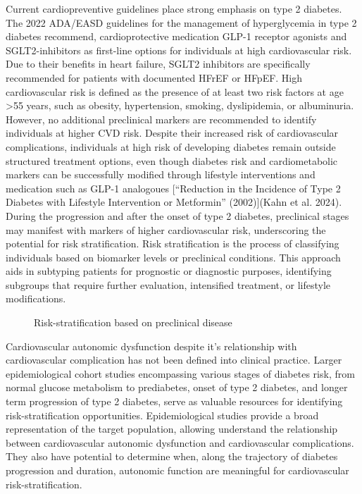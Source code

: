 \documentclass[
  a4paper,
  headsepline=true,
  open=any]{scrbook}
\begin{document}
Current cardiopreventive guidelines place strong emphasis on type 2
diabetes. The 2022 ADA/EASD guidelines for the management of
hyperglycemia in type 2 diabetes recommend, cardioprotective medication
GLP-1 receptor agonists and SGLT2-inhibitors as first-line options for
individuals at high cardiovascular risk. Due to their benefits in heart
failure, SGLT2 inhibitors are specifically recommended for patients with
documented HFrEF or HFpEF. High cardiovascular risk is defined as the
presence of at least two risk factors at age \textgreater55 years, such
as obesity, hypertension, smoking, dyslipidemia, or albuminuria.
However, no additional preclinical markers are recommended to identify
individuals at higher CVD risk. Despite their increased risk of
cardiovascular complications, individuals at high risk of developing
diabetes remain outside structured treatment options, even though
diabetes risk and cardiometabolic markers can be successfully modified
through lifestyle interventions and medication such as GLP-1 analogoues
{[}{``Reduction in the Incidence of Type 2 Diabetes with Lifestyle
Intervention or Metformin''} (2002){]}(Kahn et al. 2024). During the
progression and after the onset of type 2 diabetes, preclinical stages
may manifest with markers of higher cardiovascular risk, underscoring
the potential for risk stratification. Risk stratification is the
process of classifying individuals based on biomarker levels or
preclinical conditions. This approach aids in subtyping patients for
prognostic or diagnostic purposes, identifying subgroups that require
further evaluation, intensified treatment, or lifestyle modifications.

\begin{figure}

\begin{minipage}[t]{\linewidth}

{\centering 


\caption{Risk-stratification based on preclinical disease}

}

\end{minipage}%

\end{figure}

Cardiovascular autonomic dysfunction despite it's relationship with
cardiovascular complication has not been defined into clinical practice.
Larger epidemiological cohort studies encompassing various stages of
diabetes risk, from normal glucose metabolism to prediabetes, onset of
type 2 diabetes, and longer term progression of type 2 diabetes, serve
as valuable resources for identifying risk-stratification opportunities.
Epidemiological studies provide a broad representation of the target
population, allowing understand the relationship between cardiovascular
autonomic dysfunction and cardiovascular complications. They also have
potential to determine when, along the trajectory of diabetes
progression and duration, autonomic function are meaningful for
cardiovascular risk-stratification.
\end{document}
